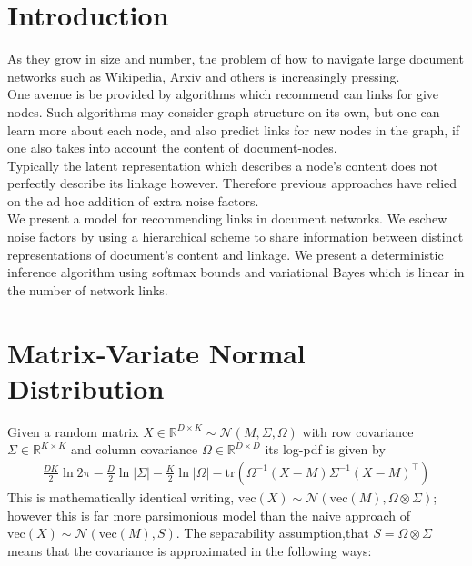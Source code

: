 \documentclass{sciposter}
\newcommand \vecf[1] {
    \text{vec}\left(#1\right)
}
\newcommand \halve[1] {
	\frac{#1}{2}
}
\newcommand \tr { \text{tr} }
\newcommand \T { ^\top }
\newcommand \nor[2]   { \mathcal{N} \left( {#1}, {#2} \right) }
\newcommand \mnor[3]  { \mathcal{N} \left(#1, #2, #3\right) }
\newcommand \Tr[1]   { \tr \left(  {#1}  \right) }
\newcommand \MReal[2] { { \mathbb{R}^{#1 \times #2} } }
\newcommand \inv[1] { {#1}^{-1} }
\begin{document}
\begin{multicols}{3}

\section{Introduction}
As they grow in size and number, the problem of how to navigate large document networks such as Wikipedia, Arxiv and others is increasingly pressing. \\

One avenue is be provided by algorithms which recommend can links for give nodes. Such algorithms may consider graph structure on its own\cite{Gopalan2013b}, but one can learn more about each node, and also predict links for new nodes in the graph, if one also takes into account the content of document-nodes. \\

Typically the latent representation which describes a node's content does not perfectly describe its linkage however. Therefore previous approaches have relied on the ad hoc addition of extra noise factors\cite{Chang2009a}\cite{Neiswanger2014}. \\

We present a model for recommending links in document networks. We eschew noise factors by using a hierarchical scheme to share information between distinct representations of document's content and linkage. We present a deterministic inference algorithm using softmax bounds and variational Bayes which is linear in the number of network links.


\section{Matrix-Variate Normal Distribution}
Given a random matrix $X \in \MReal{D}{K} \sim \mnor{M}{\Sigma}{\Omega}$ with row covariance $\Sigma \in \MReal{K}{K}$ and column covariance $\Omega \in \MReal{D}{D}$ its log-pdf is given by
\begin{align*}
\halve{DK}\ln 2\pi - \halve{D}\ln|\Sigma| - \halve{K} \ln|\Omega| -\Tr{\inv{\Omega}(X - M)\inv{\Sigma}(X - M)\T}
\end{align*}
This is mathematically identical writing, $\vecf{X} \sim \nor{\vecf{M}}{\Omega \otimes \Sigma}$; however this is far more parsimonious model than the naive approach of $\vecf{X} \sim \nor{\vecf{M}}{S}$. The separability assumption,that $S = \Omega \otimes \Sigma$ means that the covariance is approximated in the following ways:


\end{multicols}
\end{document}
